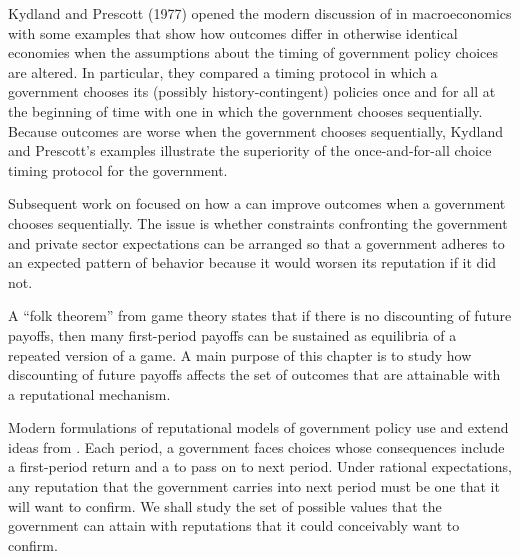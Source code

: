 Kydland and Prescott (1977)
opened the modern discussion of  in macroeconomics
with some examples that show how outcomes differ in otherwise
identical economies when the assumptions about the timing of
government policy choices are altered.   In particular, they compared
a timing protocol in which a government chooses its (possibly
history-contingent) policies once and for all at the beginning of
time with one in which the government chooses sequentially.
Because outcomes are worse when the government chooses sequentially,
Kydland and Prescott's examples illustrate the superiority of the once-and-for-all choice timing protocol
for the government.%
%
%
%
%

Subsequent work on 
focused on how
a  can improve outcomes  when a government chooses sequentially.  The issue is whether
constraints confronting the government and private sector expectations %
can be arranged so that a government
adheres to an expected
pattern of behavior because it would worsen its  reputation
if it did not.%
%
%
    

A ``folk theorem'' from game theory states that if there is no discounting of future payoffs,
then  many  first-period payoffs can be sustained as equilibria of  a repeated version of a game.
  A main purpose of this chapter is to study how discounting of future payoffs
affects the set of  outcomes that are attainable with a reputational
mechanism.
%

Modern formulations of reputational models of government policy use and extend ideas
from .   Each period, a government faces choices whose
consequences include a first-period return and a 
to pass on to next period. Under rational expectations, any reputation that
the government carries into next period must be one that it will want to confirm.
We shall study the set of possible values that the government can attain with
reputations that it could conceivably want to confirm.
%
%
%
%
%
%

